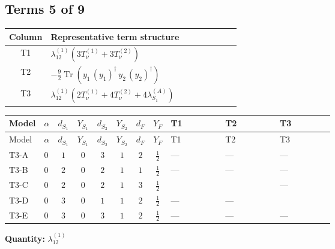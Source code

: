 \documentclass[8pt]{article}
\begin{document}
\begin{landscape}
\subsection*{Terms 5 of 9}
\begin{center}
\begin{tabular}{@{}c >{\raggedright\arraybackslash}p{0.82\linewidth}@{}}
\toprule
Column & Representative term structure \\
\midrule
T1 & \(\displaystyle {\lambda_{12}^{(1)}} (3 T_{\nu}^{(1)}+3 T_{\nu}^{(2)})\) \\
\midrule
T2 & \(\displaystyle -\frac{9}{2} \operatorname{Tr}\!\left({y_1}\,\left({y_1}\right)^{\dagger}\,{y_2}\,\left({y_2}\right)^{\dagger}\right)\) \\
\midrule
T3 & \(\displaystyle {\lambda_{12}^{(1)}} (2 T_{\nu}^{(1)}+4 T_{\nu}^{(2)}+4 {\lambda_{S_1}^{(A)}})\) \\
\midrule
\bottomrule
\end{tabular}
\end{center}
\smallskip
\tiny
\begin{longtable}{@{}llcccccc >{\raggedright\arraybackslash}p{0.21\linewidth} >{\raggedright\arraybackslash}p{0.21\linewidth} >{\raggedright\arraybackslash}p{0.21\linewidth}@{}}
\toprule
Model & $\alpha$ & $d_{S_1}$ & $Y_{S_1}$ & $d_{S_2}$ & $Y_{S_2}$ & $d_F$ & $Y_F$ & T1 & T2 & T3 \\
\midrule
\endfirsthead
\toprule
Model & $\alpha$ & $d_{S_1}$ & $Y_{S_1}$ & $d_{S_2}$ & $Y_{S_2}$ & $d_F$ & $Y_F$ & T1 & T2 & T3 \\
\midrule
\endhead
T3-A & $0$ & $1$ & $0$ & $3$ & $1$ & $2$ & $\frac{1}{2}$ & --- & --- & --- \\
\midrule
T3-B & $0$ & $2$ & $0$ & $2$ & $1$ & $1$ & $\frac{1}{2}$ & --- & --- & --- \\
\midrule
T3-C & $0$ & $2$ & $0$ & $2$ & $1$ & $3$ & $\frac{1}{2}$ & \scriptsize\adjustbox{max width=\linewidth}{$\begin{gathered} {\lambda_{12}^{(1)}} (3 T_{\nu}^{(1)}+3 T_{\nu}^{(2)})\end{gathered}$} & \scriptsize\adjustbox{max width=\linewidth}{$\begin{gathered} -\frac{9}{2} \operatorname{Tr}\!\left({y_1}\,\left({y_1}\right)^{\dagger}\,{y_2}\,\left({y_2}\right)^{\dagger}\right)\end{gathered}$} & --- \\
\midrule
T3-D & $0$ & $3$ & $0$ & $1$ & $1$ & $2$ & $\frac{1}{2}$ & --- & --- & \scriptsize\adjustbox{max width=\linewidth}{$\begin{gathered} {\lambda_{12}^{(1)}} (2 T_{\nu}^{(1)}+4 T_{\nu}^{(2)}+4 {\lambda_{S_1}^{(A)}})\end{gathered}$} \\
\midrule
T3-E & $0$ & $3$ & $0$ & $3$ & $1$ & $2$ & $\frac{1}{2}$ & --- & --- & --- \\
\midrule
\bottomrule
\end{longtable}
\clearpage
\noindent\textbf{Quantity: }$\lambda_{12}^{(1)}$\par\smallskip

\end{landscape}
\end{document}
